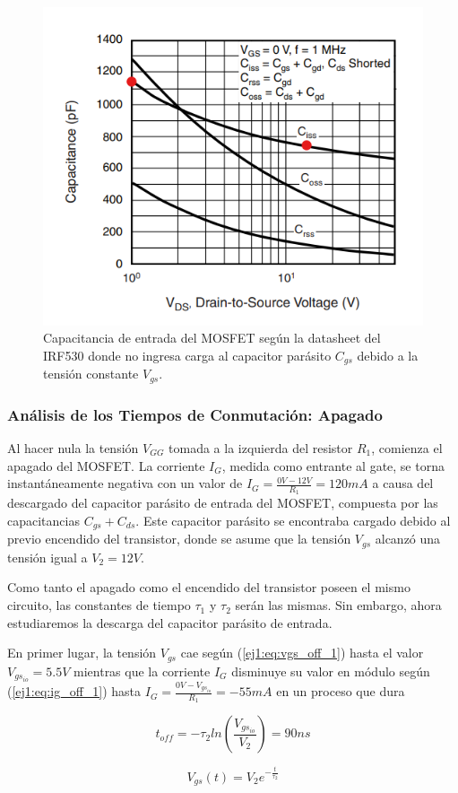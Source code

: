 \begin{figure}[H]
	\centering
	\includegraphics[width=0.4\linewidth]{ImagenesEjercicio-1/Vds-C}
	\caption{Capacitancia de entrada del MOSFET según la datasheet del IRF530 donde no ingresa carga al capacitor parásito $C_{gs}$ debido a la tensión constante $V_{gs}$.}
	\label{ej1:fig:cgd}
\end{figure}

\subsubsection{Análisis de los Tiempos de Conmutación: Apagado}

Al hacer nula la tensión $V_{GG}$ tomada a la izquierda del resistor $R_1$, comienza el apagado del MOSFET. La corriente $I_G$, medida como entrante al gate, se torna instantáneamente negativa con un valor de $I_G = \frac{0V-12V}{R_1} = 120mA$ a causa del descargado del capacitor parásito de entrada del MOSFET, compuesta por las capacitancias $C_{gs} + C_{ds}$. Este capacitor parásito se encontraba cargado debido al previo encendido del transistor, donde se asume que la tensión $V_{gs}$ alcanzó una tensión igual a $V_2 = 12V$.

Como tanto el apagado como el encendido del transistor poseen el mismo circuito, las constantes de tiempo $\tau_1$ y $\tau_2$ serán las mismas. Sin embargo, ahora estudiaremos la descarga del capacitor parásito de entrada.

En primer lugar, la tensión $V_{gs}$ cae según (\ref{ej1:eq:vgs_off_1}) hasta el valor $V_{gs_{io}} = 5.5V$ mientras que la corriente $I_G$ disminuye su valor en módulo según (\ref{ej1:eq:ig_off_1}) hasta $I_G = \frac{0V - V_{gs_{io}}}{R_1} = -55mA$ en un proceso que dura

\begin{equation}
t_{off} = -\tau_2 ln(\frac{V_{gs_{io}}}{V_2}) = 90ns
\label{ej1:eq:toff}
\end{equation}

\begin{equation}
V_{gs}(t) = V_2e^{-\frac{t}{\tau_2}}
\label{ej1:eq:vgs_off_1}
\end{equation}

